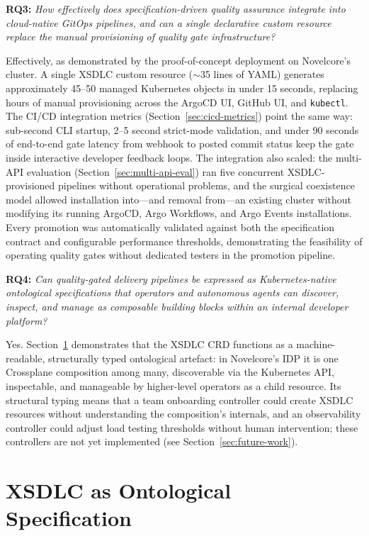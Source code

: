 \textbf{RQ3:} \textit{How effectively does specification-driven quality assurance integrate into cloud-native GitOps pipelines, and can a single declarative custom resource replace the manual provisioning of quality gate infrastructure?}

Effectively, as demonstrated by the proof-of-concept deployment on Novelcore's cluster. A single XSDLC custom resource (\(\sim\)35 lines of YAML) generates approximately 45--50 managed Kubernetes objects in under 15 seconds, replacing hours of manual provisioning across the ArgoCD UI, GitHub UI, and \texttt{kubectl}. The CI/CD integration metrics (Section~\ref{sec:cicd-metrics}) point the same way: sub-second CLI startup, 2--5 second strict-mode validation, and under 90 seconds of end-to-end gate latency from webhook to posted commit status keep the gate inside interactive developer feedback loops. The integration also scaled: the multi-API evaluation (Section~\ref{sec:multi-api-eval}) ran five concurrent XSDLC-provisioned pipelines without operational problems, and the surgical coexistence model allowed installation into---and removal from---an existing cluster without modifying its running ArgoCD, Argo Workflows, and Argo Events installations. Every promotion was automatically validated against both the specification contract and configurable performance thresholds, demonstrating the feasibility of operating quality gates without dedicated testers in the promotion pipeline.

\textbf{RQ4:} \textit{Can quality-gated delivery pipelines be expressed as Kubernetes-native ontological specifications that operators and autonomous agents can discover, inspect, and manage as composable building blocks within an internal developer platform?}

Yes. Section~\ref{sec:ontological-spec} demonstrates that the XSDLC CRD functions as a machine-readable, structurally typed ontological artefact: in Novelcore's IDP it is one Crossplane composition among many, discoverable via the Kubernetes API, inspectable, and manageable by higher-level operators as a child resource. Its structural typing means that a team onboarding controller could create XSDLC resources without understanding the composition's internals, and an observability controller could adjust load testing thresholds without human intervention; these controllers are not yet implemented (see Section~\ref{sec:future-work}).

\section{XSDLC as Ontological Specification}
\label{sec:ontological-spec}

